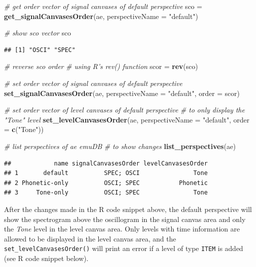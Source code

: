 \documentclass[]{book}
\newenvironment{Shaded}{\begin{snugshade}}{\end{snugshade}}
\newcommand{\CommentTok}[1]{\textcolor[rgb]{0.56,0.35,0.01}{\textit{#1}}}
\newcommand{\DataTypeTok}[1]{\textcolor[rgb]{0.13,0.29,0.53}{#1}}
\newcommand{\KeywordTok}[1]{\textcolor[rgb]{0.13,0.29,0.53}{\textbf{#1}}}
\newcommand{\NormalTok}[1]{#1}
\newcommand{\StringTok}[1]{\textcolor[rgb]{0.31,0.60,0.02}{#1}}
\theoremstyle{definition}
\theoremstyle{definition}
\theoremstyle{definition}
\theoremstyle{remark}
\begin{document}
\begin{Shaded}
\begin{Highlighting}[]
\CommentTok{# get order vector of signal canvases of default perspective}
\NormalTok{sco =}\StringTok{ }\KeywordTok{get_signalCanvasesOrder}\NormalTok{(ae,}
                              \DataTypeTok{perspectiveName =} \StringTok{"default"}\NormalTok{)}

\CommentTok{# show sco vector}
\NormalTok{sco}
\end{Highlighting}
\end{Shaded}

\begin{verbatim}
## [1] "OSCI" "SPEC"
\end{verbatim}

\begin{Shaded}
\begin{Highlighting}[]
\CommentTok{# reverse sco order}
\CommentTok{# using R's rev() function}
\NormalTok{scor =}\StringTok{ }\KeywordTok{rev}\NormalTok{(sco)}

\CommentTok{# set order vector of signal canvases of default perspective}
\KeywordTok{set_signalCanvasesOrder}\NormalTok{(ae,}
                        \DataTypeTok{perspectiveName =} \StringTok{"default"}\NormalTok{,}
                        \DataTypeTok{order =}\NormalTok{ scor)}

\CommentTok{# set order vector of level canvases of default perspective}
\CommentTok{# to only display the "Tone" level}
\KeywordTok{set_levelCanvasesOrder}\NormalTok{(ae,}
                       \DataTypeTok{perspectiveName =} \StringTok{"default"}\NormalTok{,}
                       \DataTypeTok{order =} \KeywordTok{c}\NormalTok{(}\StringTok{"Tone"}\NormalTok{))}

\CommentTok{# list perspectives of ae emuDB}
\CommentTok{# to show changes}
\KeywordTok{list_perspectives}\NormalTok{(ae)}
\end{Highlighting}
\end{Shaded}

\begin{verbatim}
##            name signalCanvasesOrder levelCanvasesOrder
## 1       default          SPEC; OSCI               Tone
## 2 Phonetic-only          OSCI; SPEC           Phonetic
## 3     Tone-only          OSCI; SPEC               Tone
\end{verbatim}

After the changes made in the R code snippet above, the default
perspective will show the spectrogram above the oscillogram in the
signal canvas area and only the \emph{Tone} level in the level canvas
area. Only levels with time information are allowed to be displayed in
the level canvas area, and the \texttt{set\_levelCanvasesOrder()} will
print an error if a level of type \texttt{ITEM} is added (see R code
snippet below).
\end{document}
